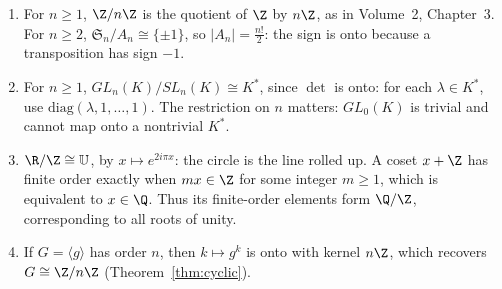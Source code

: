 \begin{example}\label{ex:iso1}
\begin{enumerate}[label=(\arabic*)]
\item For $n\ge1$, $\Z/n\Z$ is the quotient of $\Z$ by $n\Z$, as in Volume~2, Chapter~3. For $n\ge2$, $\mathfrak S_n/A_n\cong\{\pm1\}$, so $|A_n|=\frac{n!}2$: the sign is onto because a transposition has sign $-1$.
\item For $n\ge1$, $GL_n(K)/SL_n(K)\cong K^*$, since $\det$ is onto: for each $\lambda\in K^*$, use $\mathrm{diag}(\lambda,1,\dots,1)$. The restriction on $n$ matters: $GL_0(K)$ is trivial and cannot map onto a nontrivial $K^*$.
\item $\R/\Z\cong\mathbb U$, by $x\mapsto e^{2i\pi x}$: the circle is the line rolled up. A coset $x+\Z$ has finite order exactly when $mx\in\Z$ for some integer $m\ge1$, which is equivalent to $x\in\Q$. Thus its finite-order elements form $\Q/\Z$, corresponding to all roots of unity.
\item If $G=\langle g\rangle$ has order $n$, then $k\mapsto g^k$ is onto with kernel $n\Z$, which recovers $G\cong\Z/n\Z$ (Theorem~\ref{thm:cyclic}).
\end{enumerate}
\end{example}

